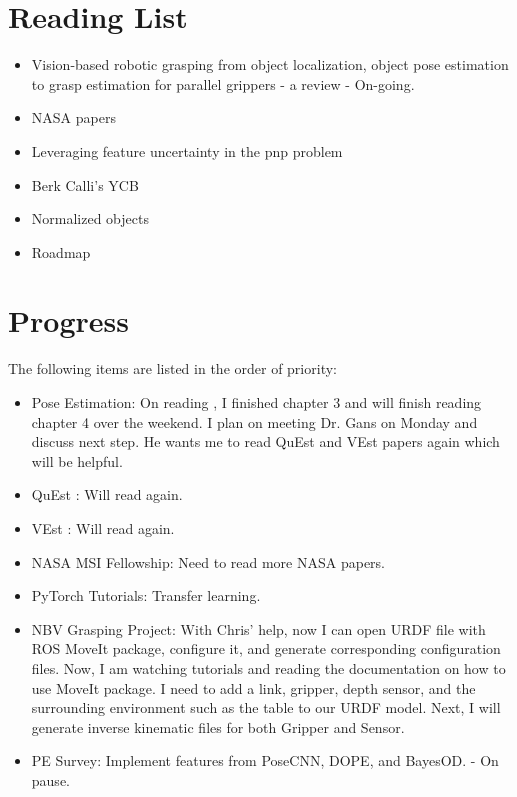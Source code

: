 \documentclass[11pt]{article}
\begin{document}
\section{Reading List}
\begin{itemize}
      \item Vision-based robotic grasping from object localization, object pose estimation to grasp estimation for parallel grippers - a review \cite{du2020vision} - On-going.
      \item NASA papers \cite{NASATech44:online}
      \item Leveraging feature uncertainty in the pnp problem \cite{ferraz2014leveraging}
      \item Berk Calli's YCB \cite{calli2015ycb}
      \item Normalized objects \cite{Wang_2019_CVPR}
      \item Roadmap \cite{roadmap251:online}
\end{itemize}

\section{Progress}
The following items are listed in the order of priority:
\begin{itemize}
      \item Pose Estimation: On reading \cite{du2020vision}, I finished chapter 3 and will finish reading chapter 4 over the weekend. I plan on meeting Dr. Gans on Monday and discuss next step. He wants me to read QuEst and VEst papers again which will be helpful.

      \item QuEst \cite{QuEst}: Will read again.
      \item VEst \cite{dani2009position}: Will read again.
      \item NASA MSI Fellowship: Need to read more NASA papers.
      \item PyTorch Tutorials: Transfer learning.

      \item NBV Grasping Project: With Chris' help, now I can open URDF file with ROS MoveIt package, configure it, and generate corresponding configuration files. Now, I am watching tutorials and reading the documentation on how to use MoveIt package. I need to add a link, gripper, depth sensor, and the surrounding environment such as the table to our URDF model. Next, I will generate inverse kinematic files for both Gripper and Sensor.

      \item PE Survey: Implement features from PoseCNN, DOPE, and BayesOD. - On pause.
\end{itemize}
\end{document}

